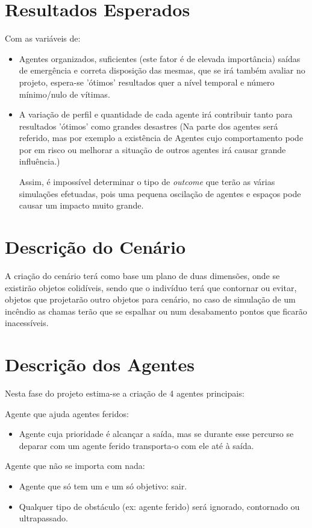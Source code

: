 \documentclass[a4paper,11pt]{article}
\begin{document}
\section{Resultados Esperados}
Com as variáveis de:
\begin{itemize}
\item Agentes organizados, suficientes (este fator é de elevada importância) saídas de emergência e correta disposição das mesmas, que se irá também avaliar no projeto, espera-se 'ótimos' resultados quer a nível temporal e número mínimo/nulo de vítimas.

\item A variação de perfil e quantidade de cada agente irá contribuir tanto para resultados 'ótimos' como grandes desastres (Na parte dos agentes será referido, mas por exemplo a existência de Agentes cujo comportamento pode por em risco ou melhorar a situação de outros agentes irá causar grande influência.)

Assim, é impossível determinar o tipo de \textit{outcome} que terão as várias simulações efetuadas, pois uma pequena oscilação de agentes e espaços pode causar um impacto muito grande.
\end{itemize}

\section{Descrição do Cenário}

A criação do cenário terá como base um plano de duas dimensões, onde se existirão objetos colidíveis, sendo que o indivíduo terá que contornar ou evitar, objetos que projetarão outro objetos para cenário, no caso de simulação de um incêndio as chamas terão que se espalhar ou num desabamento pontos que ficarão inacessíveis. 


\section{Descrição dos Agentes}
Nesta fase do projeto estima-se a criação de 4 agentes principais:

Agente que ajuda agentes feridos:
\begin{itemize}
\item Agente cuja prioridade é alcançar a saída, mas se durante esse percurso se deparar com um agente ferido transporta-o com ele até à saída.
\\
\end{itemize}

Agente que não se importa com nada:
\begin{itemize}
\item Agente que só tem um e um só objetivo: sair. 
\item Qualquer tipo de obstáculo (ex: agente ferido) será ignorado, contornado ou ultrapassado. 
\\
\end{itemize}
\end{document}
